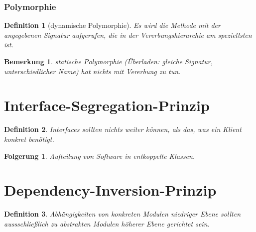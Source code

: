 \documentclass[a4paper]{article}
\theoremstyle{break}
\newtheorem{defi}{Definition}[section]
\newtheorem{ann}{Bemerkung}[section]
\newtheorem{der}{Folgerung}[section]
\begin{document}
\subsubsection{Polymorphie}
\begin{defi}[dynamische Polymorphie]
	Es wird die Methode mit der angegebenen Signatur aufgerufen, die in der Vererbungshierarchie am speziellsten ist.
\end{defi}

\begin{ann}
	statische Polymorphie (Überladen: gleiche Signatur, unterschiedlicher Name) hat nichts mit Vererbung zu tun.
\end{ann}

\section{Interface-Segregation-Prinzip}
\begin{defi}
	Interfaces sollten nichts weiter können, als das, was ein Klient konkret benötigt.
\end{defi}
\begin{der}
	Aufteilung von Software in entkoppelte Klassen. 
\end{der}

\section{Dependency-Inversion-Prinzip}
\begin{defi}
	Abhängigkeiten von konkreten Modulen niedriger Ebene sollten aussschließlich zu abstrakten Modulen höherer Ebene gerichtet sein.
\end{defi}

	
\end{document}
